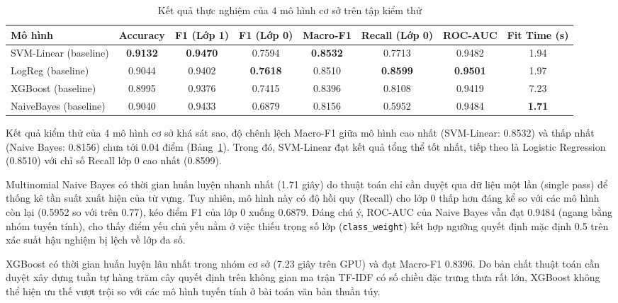 \begin{table}[H]
\centering
\small
\setlength{\tabcolsep}{4pt}
\begin{tabular}{|l|c|c|c|c|c|c|c|}
\hline
\textbf{Mô hình} & \textbf{Accuracy} & \textbf{F1 (Lớp 1)} & \textbf{F1 (Lớp 0)} & \textbf{Macro-F1} & \textbf{Recall (Lớp 0)} & \textbf{ROC-AUC} & \textbf{Fit Time (s)} \\ \hline
SVM-Linear (baseline) & \textbf{0.9132} & \textbf{0.9470} & 0.7594 & \textbf{0.8532} & 0.7713 & 0.9482 & 1.94 \\ \hline
LogReg (baseline) & 0.9044 & 0.9402 & \textbf{0.7618} & 0.8510 & \textbf{0.8599} & \textbf{0.9501} & 1.97 \\ \hline
XGBoost (baseline) & 0.8995 & 0.9376 & 0.7415 & 0.8396 & 0.8108 & 0.9419 & 7.23 \\ \hline
NaiveBayes (baseline) & 0.9040 & 0.9433 & 0.6879 & 0.8156 & 0.5952 & 0.9484 & \textbf{1.71} \\ \hline
\end{tabular}
\caption{Kết quả thực nghiệm của 4 mô hình cơ sở trên tập kiểm thử}
\label{tab:baseline_results}
\end{table}

Kết quả kiểm thử của 4 mô hình cơ sở khá sát sao, độ chênh lệch Macro-F1 giữa mô hình cao nhất (SVM-Linear: 0.8532) và thấp nhất (Naive Bayes: 0.8156) chưa tới 0.04 điểm (Bảng~\ref{tab:baseline_results}). Trong đó, SVM-Linear đạt kết quả tổng thể tốt nhất, tiếp theo là Logistic Regression (0.8510) với chỉ số Recall lớp 0 cao nhất (0.8599). 

Multinomial Naive Bayes có thời gian huấn luyện nhanh nhất (1.71 giây) do thuật toán chỉ cần duyệt qua dữ liệu một lần (single pass) để thống kê tần suất xuất hiện của từ vựng. Tuy nhiên, mô hình này có độ hồi quy (Recall) cho lớp 0 thấp hơn đáng kể so với các mô hình còn lại (0.5952 so với trên 0.77), kéo điểm F1 của lớp 0 xuống 0.6879. Đáng chú ý, ROC-AUC của Naive Bayes vẫn đạt 0.9484 (ngang bằng nhóm tuyến tính), cho thấy điểm yếu chủ yếu nằm ở việc thiếu trọng số lớp (\texttt{class\_weight}) kết hợp ngưỡng quyết định mặc định 0.5 trên xác suất hậu nghiệm bị lệch về lớp đa số.

XGBoost có thời gian huấn luyện lâu nhất trong nhóm cơ sở (7.23 giây trên GPU) và đạt Macro-F1 0.8396. Do bản chất thuật toán cần duyệt xây dựng tuần tự hàng trăm cây quyết định trên không gian ma trận TF-IDF có số chiều đặc trưng thưa rất lớn, XGBoost không thể hiện ưu thế vượt trội so với các mô hình tuyến tính ở bài toán văn bản thuần túy.

